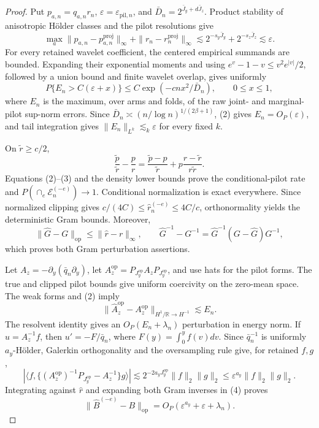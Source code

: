 \documentclass{article}
\begin{document}
\begin{proof}
Put \(p_{a,n}=q_{a,n}r_n\), \(\varepsilon=\varepsilon_{\mathrm{pil},n}\), and \(\bar D_n=2^{\bar J_y+d\bar J_z}\).  Product stability of anisotropic H\"older classes and the pilot resolutions give
\[
\max_a\|p_{a,n}-p_{a,n}^{\mathrm{proj}}\|_\infty
+\|r_n-r_n^{\mathrm{proj}}\|_\infty
\lesssim2^{-s_y\bar J_y}+2^{-s_z\bar J_z}\lesssim\varepsilon. \tag{1}
\]
For every retained wavelet coefficient, the centered empirical summands are bounded.  Expanding their exponential moments and using \(e^v-1-v\le v^2e^{|v|}/2\), followed by a union bound and finite wavelet overlap, gives uniformly
\[
P\{E_n>C(\varepsilon+x)\}\le C\exp(-cnx^2/\bar D_n),\qquad0\le x\le1, \tag{2}
\]
where \(E_n\) is the maximum, over arms and folds, of the raw joint- and marginal-pilot sup-norm errors.  Since \(\bar D_n\asymp(n/\log n)^{1/(2\beta+1)}\), (2) gives \(E_n=O_P(\varepsilon)\), and tail integration gives \(\|E_n\|_{L^k}\lesssim_k\varepsilon\) for every fixed \(k\).

On \(\widetilde r\ge c/2\),
\[
\frac{\widetilde p}{\widetilde r}-\frac pr
=\frac{\widetilde p-p}{\widetilde r}
+p\frac{r-\widetilde r}{r\widetilde r}. \tag{3}
\]
Equations (2)--(3) and the density lower bounds prove the conditional-pilot rate and \(P(\cap_e\mathcal E_n^{(-e)})\to1\).  Conditional normalization is exact everywhere.  Since normalized clipping gives \(c/(4C)\le\widehat r_n^{(-e)}\le4C/c\), orthonormality yields the deterministic Gram bounds.  Moreover,
\[
\|\widehat G-G\|_{\mathrm{op}}\le\|\widehat r-r\|_\infty,
\qquad \widehat G^{-1}-G^{-1}=\widehat G^{-1}(G-\widehat G)G^{-1}, \tag{4}
\]
which proves both Gram perturbation assertions.

Let \(A_z=-\partial_y(\bar q_n\partial_y)\), let \(A_z^{\mathrm{op}}=P_{J_y^{\mathrm{op}}}A_zP_{J_y^{\mathrm{op}}}\), and use hats for the pilot forms.  The true and clipped pilot bounds give uniform coercivity on the zero-mean space.  The weak forms and (2) imply
\[
\|\widehat A_z^{\mathrm{op}}-A_z^{\mathrm{op}}\|_{H^1/\mathbb R\to H^{-1}}
\lesssim E_n. \tag{5}
\]
The resolvent identity gives an \(O_P(E_n+\lambda_n)\) perturbation in energy norm.  If \(u=A_z^{-1}f\), then \(u'=-F/\bar q_n\), where \(F(y)=\int_0^yf(v)dv\).  Since \(\bar q_n^{-1}\) is uniformly \(a_y\)-H\"older, Galerkin orthogonality and the oversampling rule give, for retained \(f,g\),
\[
|\langle f,\{(A_z^{\mathrm{op}})^{-1}P_{J_y^{\mathrm{op}}}-A_z^{-1}\}g\rangle|
\lesssim2^{-2a_yJ_y^{\mathrm{op}}}\|f\|_2\|g\|_2
\le\varepsilon^{a_y}\|f\|_2\|g\|_2. \tag{6}
\]
Integrating against \(\widehat r\) and expanding both Gram inverses in (4) proves
\[
\|\widehat B^{(-e)}-B\|_{\mathrm{op}}
=O_P(\varepsilon^{a_y}+\varepsilon+\lambda_n). \tag{7}
\]


\end{proof}
\end{document}

